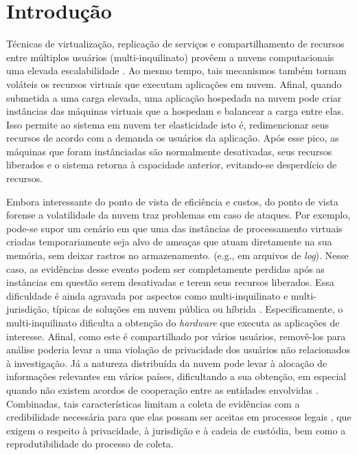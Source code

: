\chapter{Introdução}
\label{chp:intro}

%
Técnicas de virtualização, replicação de serviços e compartilhamento de recursos entre múltiplos usuários (multi-inquilinato) provêem a nuvens computacionais uma elevada escalabilidade \cite{MorsyCloudSecurity:2010}.
%
Ao mesmo tempo, tais mecanismos também tornam voláteis os recursos virtuais que executam aplicações em nuvem.
%
Afinal, quando submetida a uma carga elevada, uma aplicação hospedada na nuvem pode criar instâncias das máquinas virtuais que a hospedam e balancear a carga entre elas.
%
Isso permite ao sistema em nuvem ter elasticidade isto é, redimencionar seus recursos de acordo com a demanda os usuários da aplicação. 
%
Após esse pico, as máquinas que foram instânciadas são normalmente desativadas, seus recursos liberados e o sistema retorna à capacidade anterior, evitando-se desperdício de recursos.


%
Embora interessante do ponto de vista de eficiência e custos, do ponto de vista forense a volatilidade da nuvem traz problemas em caso de ataques.
%
Por exemplo, pode-se supor um cenário em que uma das instâncias de processamento virtuais criadas temporariamente seja alvo de ameaças que atuam diretamente na sua memória, sem deixar rastros no armazenamento. (e.g., em arquivos de \textit{log}).
%
Nesse caso, as evidências desse evento podem ser completamente perdidas após as instâncias em questão serem desativadas e terem seus recursos liberados.
%
Essa dificuldade é ainda agravada por aspectos como multi-inquilinato e multi-jurisdição, típicas de soluções em nuvem pública ou híbrida \cite{BashAdvInForensics:2015}.
%
Especificamente, o multi-inquilinato dificulta a obtenção do \textit{hardware} que executa as aplicações de interesse.
%
Afinal, como este é compartilhado por vários usuários, removê-los para análise poderia levar a uma violação de privacidade dos usuários não relacionados à investigação. 
%
Já a natureza distribuída da nuvem pode levar à alocação de informações relevantes em vários países, dificultando a sua obtenção, em especial quando não existem acordos de cooperação entre as entidades envolvidas \cite{DykstraAcquiringForIAAS:2012}.
%
Combinadas, tais características limitam a coleta de evidências com a credibilidade necessária para que elas possam ser aceitas em processos legais \cite{RahmanLiveForensicsTechniques:2015}, que exigem o respeito à privacidade, à jurisdição e à cadeia de custódia, bem como a reprodutibilidade do processo de coleta.
